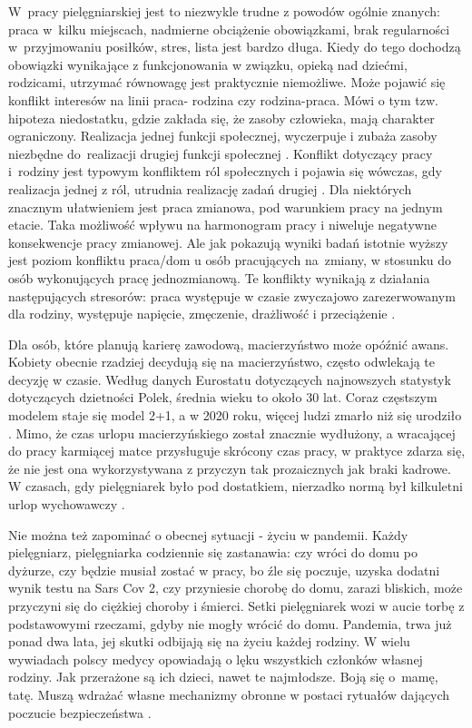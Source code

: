 \documentclass[a4paper,12pt,twoside,openright]{mwrep}
\begin{document}
W~pracy pielęgniarskiej jest to niezwykle trudne z powodów ogólnie znanych: praca w~kilku miejscach, nadmierne obciążenie obowiązkami, brak regularności w~przyjmowaniu posiłków, stres, lista jest bardzo długa. Kiedy do tego dochodzą obowiązki wynikające z funkcjonowania w związku, opieką nad dziećmi, rodzicami, utrzymać równowagę jest praktycznie niemożliwe. Może pojawić się konflikt interesów na linii praca- rodzina czy rodzina-praca. Mówi o tym tzw. hipoteza niedostatku,  gdzie zakłada się, że zasoby człowieka, mają charakter ograniczony. Realizacja jednej funkcji społecznej, wyczerpuje i zubaża zasoby niezbędne do~realizacji drugiej funkcji społecznej \cite{hipoteza}. Konflikt dotyczący pracy i~rodziny jest typowym konfliktem ról społecznych i pojawia się wówczas, gdy realizacja jednej z ról, utrudnia realizację zadań drugiej \cite{relacja}. Dla niektórych znacznym ułatwieniem jest praca zmianowa, pod warunkiem pracy na jednym etacie. Taka możliwość wpływu na harmonogram pracy i niweluje negatywne konsekwencje pracy zmianowej. Ale jak pokazują wyniki badań istotnie wyższy jest poziom konfliktu praca/dom u osób pracujących na~zmiany, w stosunku do osób wykonujących pracę jednozmianową. Te konflikty wynikają z działania następujących stresorów: praca występuje w czasie zwyczajowo zarezerwowanym dla rodziny, występuje napięcie, zmęczenie, drażliwość i przeciążenie \cite{konflikt}.
  
Dla osób, które planują karierę zawodową, macierzyństwo może opóźnić awans. Kobiety obecnie rzadziej decydują się na macierzyństwo, często odwlekają te decyzję w czasie. Według danych Eurostatu dotyczących najnowszych statystyk dotyczących dzietności Polek, średnia wieku to około 30 lat. Coraz częstszym modelem staje się model 2+1, a w 2020 roku, więcej ludzi zmarło niż się urodziło \cite{dzieci}. Mimo, że czas urlopu macierzyńskiego został znacznie wydłużony, a wracającej do pracy karmiącej matce przysługuje skrócony czas pracy, w praktyce zdarza się, że nie jest ona wykorzystywana z przyczyn tak prozaicznych jak braki kadrowe. W czasach, gdy pielęgniarek było pod dostatkiem, nierzadko normą był kilkuletni urlop wychowawczy \cite{urlop}.

Nie można też zapominać o obecnej sytuacji - życiu w pandemii. Każdy pielęgniarz, pielęgniarka codziennie się zastanawia: czy wróci do domu po dyżurze, czy będzie musiał zostać w pracy, bo źle się poczuje, uzyska dodatni wynik testu na Sars Cov 2, czy przyniesie chorobę do domu, zarazi bliskich, może przyczyni się do ciężkiej choroby i śmierci. Setki pielęgniarek wozi w aucie torbę z podstawowymi rzeczami, gdyby nie mogły wrócić do domu. Pandemia, trwa już ponad dwa lata, jej skutki odbijają się na życiu każdej rodziny. W wielu wywiadach polscy medycy opowiadają o lęku wszystkich członków własnej rodziny. Jak przerażone są ich dzieci, nawet te najmłodsze. Boją się o~mamę, tatę. Muszą wdrażać własne mechanizmy obronne w postaci rytuałów dających poczucie bezpieczeństwa  \cite{wywiad}.
\end{document}
